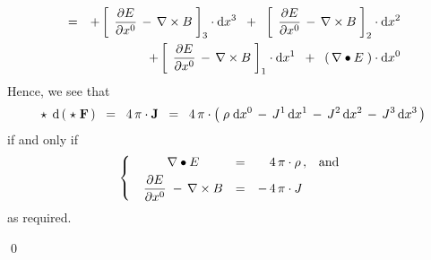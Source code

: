 \begin{enumerate}
\begin{eqnarray*}
	& = &
		+
		\left[\;\, \dfrac{\partial E}{\partial x^{0}} \, - \, \nabla \times B \;\right]_{3}
		\cdot \textnormal{d} x^ {3}
		\;\;+\;\;
		\left[\;\, \dfrac{\partial E}{\partial x^{0}} \, - \, \nabla \times B \;\right]_{2}
		\cdot \textnormal{d} x^ {2}
	\\
	&&
		+
		\left[\;\, \dfrac{\partial E}{\partial x^{0}} \, - \, \nabla \times B \;\right]_{1}
		\cdot \textnormal{d} x^ {1}
		\;\;+\;\;
		\left(\, \nabla \bullet E \;\right) \cdot \textnormal{d} x^ {0}
	\end{eqnarray*}
	Hence, we see that
	\begin{equation*}
	\star\;\,\textnormal{d}\left(\;\star\;\mathbf{F}\,\right)
	\;\; = \;\;
		4\,\pi\cdot \mathbf{J}
	\;\; = \;\;
		4\,\pi\cdot \left(\; \rho\;\textnormal{d} x^{0} \,-\, J^{1}\,\textnormal{d} x^{1} \,-\, J^{2}\,\textnormal{d} x^{2} \,-\, J^{3}\,\textnormal{d} x^{3} \,\right)
	\end{equation*}
	if and only if
	\begin{equation*}
	\left\{\;\;\begin{array}{cclc}
	\nabla \bullet E & = & {\color{white}-}\,4\,\pi\cdot\rho\,, & \textnormal{and}
	\\
	\overset{{\color{white}.}}{\dfrac{\partial E}{\partial x^{0}}} \;-\, \nabla \times B & = & -\,4\,\pi \cdot J
	\end{array}\right.
	\end{equation*}
	as required.
\end{enumerate}
\qed






